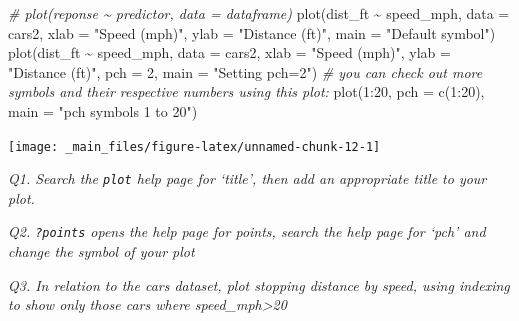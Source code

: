 \documentclass[
  11pt,
  a4paper,
]{book}
\newenvironment{Shaded}{\begin{snugshade}}{\end{snugshade}}
\newcommand{\AttributeTok}[1]{\textcolor[rgb]{0.77,0.63,0.00}{#1}}
\newcommand{\CommentTok}[1]{\textcolor[rgb]{0.56,0.35,0.01}{\textit{#1}}}
\newcommand{\DecValTok}[1]{\textcolor[rgb]{0.00,0.00,0.81}{#1}}
\newcommand{\FunctionTok}[1]{\textcolor[rgb]{0.00,0.00,0.00}{#1}}
\newcommand{\NormalTok}[1]{#1}
\newcommand{\SpecialCharTok}[1]{\textcolor[rgb]{0.00,0.00,0.00}{#1}}
\newcommand{\StringTok}[1]{\textcolor[rgb]{0.31,0.60,0.02}{#1}}
\begin{document}
\begin{Shaded}
\begin{Highlighting}[]
\CommentTok{\# plot(reponse \textasciitilde{} predictor, data = dataframe)}
\FunctionTok{plot}\NormalTok{(dist\_ft }\SpecialCharTok{\textasciitilde{}}\NormalTok{ speed\_mph,}
  \AttributeTok{data =}\NormalTok{ cars2, }\AttributeTok{xlab =} \StringTok{"Speed (mph)"}\NormalTok{, }\AttributeTok{ylab =} \StringTok{"Distance (ft)"}\NormalTok{,}
  \AttributeTok{main =} \StringTok{"Default symbol"}\NormalTok{)}
\FunctionTok{plot}\NormalTok{(dist\_ft }\SpecialCharTok{\textasciitilde{}}\NormalTok{ speed\_mph,}
  \AttributeTok{data =}\NormalTok{ cars2, }\AttributeTok{xlab =} \StringTok{"Speed (mph)"}\NormalTok{, }\AttributeTok{ylab =} \StringTok{"Distance (ft)"}\NormalTok{,}
  \AttributeTok{pch =} \DecValTok{2}\NormalTok{, }\AttributeTok{main =} \StringTok{"Setting \textquotesingle{}pch=2\textquotesingle{}"}\NormalTok{)}
\CommentTok{\# you can check out more symbols and their respective numbers using this plot:}
\FunctionTok{plot}\NormalTok{(}\DecValTok{1}\SpecialCharTok{:}\DecValTok{20}\NormalTok{, }\AttributeTok{pch =} \FunctionTok{c}\NormalTok{(}\DecValTok{1}\SpecialCharTok{:}\DecValTok{20}\NormalTok{), }\AttributeTok{main =} \StringTok{"\textquotesingle{}pch\textquotesingle{} symbols 1 to 20"}\NormalTok{)}
\end{Highlighting}
\end{Shaded}

\begin{center}\texttt{[image: \_main\_files/figure-latex/unnamed-chunk-12-1]} \end{center}

\emph{Q1. Search the \texttt{plot} help page for `title', then add an appropriate title to your plot.}

\emph{Q2. \texttt{?points} opens the help page for points, search the help page for `pch' and change the symbol of your plot}

\emph{Q3. In relation to the cars dataset, plot stopping distance by speed, using indexing to show only those cars where speed\_mph\textgreater20}

\begin{Shaded}
\end{Shaded}
\end{document}
